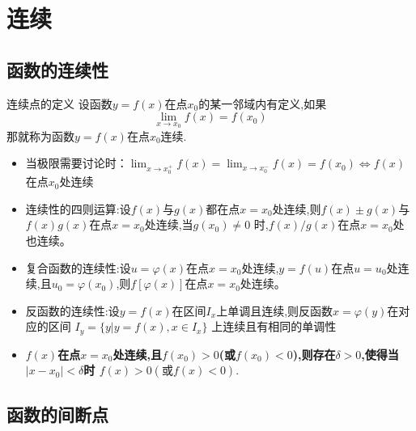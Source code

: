 \documentclass[10pt, a4paper, oneside, UTF8]{ctexbook}
\begin{document}
\begin{sloppypar}
    \else
    \fi
    \chapter{连续}
    \section{函数的连续性}
    \begin{defn}{连续点的定义}{}
        设函数$y=f(x)$在点$x_0$的某一邻域内有定义,如果
        $$
            \lim_{x\to x_0}f(x)=f(x_0)
        $$
        那就称为函数$y=f(x)$在点$x_0$连续.
    \end{defn}
    \begin{criterion}{}{}
        \begin{itemize}
            \item 当极限需要讨论时：$\lim_{x\to x_0^+}f\left(x\right)=\lim_{x\to x_0^-}f\left(x\right)=f\left(x_{0}\right)\Leftrightarrow f\left(x\right)$在点$x_{0}$处连续
            \item 连续性的四则运算:设$f(x)$与$g(x)$都在点$x=x_0$处连续,则$f(x)\pm g(x)$与$f(x)g(x)$在点$x=x_{0}$处连续,当$g(x_0)\neq0$ 时,$f(x)/g(x)$在点$x=x_{0}$处也连续。
            \item 复合函数的连续性:设$u=\varphi(x)$在点$x=x_0$处连续,$y=f(u)$在点$u=u_0$处连续,且$u_{0}=\varphi(x_{0})$,则$f\left[\varphi(x)\right]$在点$x=x_{0}$处连续。
            \item 反函数的连续性:设$y=f(x)$在区间$I_x$上单调且连续,则反函数$x=\varphi(y)$在对应的区间 $I_{y}=\{y|y=f(x),x\in I_{x}\}$ 上连续且有相同的单调性
            \item \textbf{$f(x)$在点$x=x_0$处连续,且$f(x_0)>0$(或$f(x_0)<0$),则存在$\delta>0$,使得当$|x-x_0|<\delta$时 $f\left(x\right)>0\left(\text{或}f\left(x\right)<0\right).$ }
        \end{itemize}
    \end{criterion}
    \section{函数的间断点}

\end{sloppypar}
\end{document}
